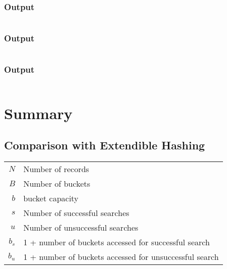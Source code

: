 \documentclass[paper=letter, fontsize=12pt]{article}
\begin{document}
\inputminted[frame=lines, breaklines, linenos]{python}{../linear_hashing.py}

\subsubsection{Output}
\inputminted[frame=lines, breaklines]{text}{../output_cap2.txt}


\subsubsection{Output}
\inputminted[frame=lines, breaklines]{text}{../output_cap3.txt}

\subsubsection{Output}
\inputminted[frame=lines, breaklines]{text}{../output_cap10.txt}

\section{Summary}

\subsection*{\textbf{Comparison with Extendible Hashing}}
\begin{table}[H]
	\begin{tabular}{r l}
		$N$ & Number of records \\
		$B$ & Number of buckets\\
		$b$ & bucket capacity \\
		$s$ & Number of successful searches \\
		$u$ & Number of unsuccessful searches \\
		$b_{s}$ & 1 + number of buckets accessed for successful search \\
		$b_{u}$ & 1 + number of buckets accessed for unsuccessful search \\
	\end{tabular}
\end{table}
\end{document}
